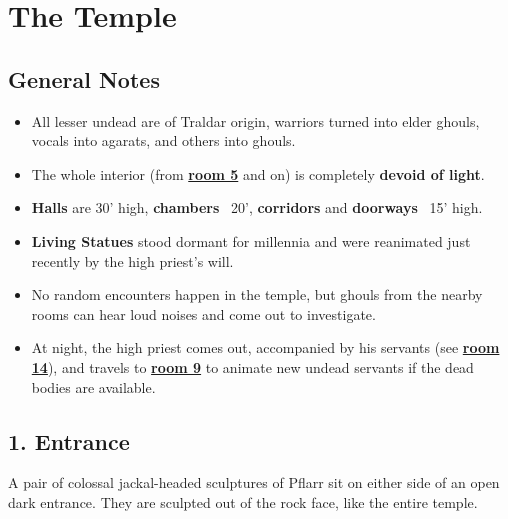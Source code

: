 \documentclass[english,11pt,openany,letterpaper,twocolumn]{book}
\begin{document}
\skipline[0pt]

\noindent
\begin{minipage}{\textwidth}
	\setmonofont{TruetypewriterPolyglOTT}
	\renewcommand{\FancyVerbFormatLine}[1]{\vspace*{-0.5ex}#1}
	{\hfill
	\hfill}
\end{minipage}

\vfill
\break


\chapter{The Temple}

\section{General Notes}

\begin{itemize}[leftmargin=*]
\item
All lesser undead are of Traldar origin, warriors turned into elder ghouls, vocals into agarats, and others into ghouls.
\item
The whole interior (from \hyperlink{room5}{\textbf{room 5}} and on) is completely \textbf{devoid of light}.
\item
\textbf{Halls} are 30' high, \textbf{chambers} \dash\ 20', \textbf{corridors} and \textbf{doorways} \dash\ 15' high.
\item
\textbf{Living Statues} stood dormant for millennia and were reanimated just recently by the high priest's will.
\item
No random encounters happen in the temple, but ghouls from the nearby rooms can hear loud noises and come out to investigate.
\item
At night, the high priest comes out, accompanied by his servants (see \hyperlink{room14}{\textbf{room 14}}), and travels to \hyperlink{room9}{\textbf{room 9}} to animate new undead servants if the dead bodies are available.
\end{itemize}


\hypertarget{room1}{}
\section{1. Entrance}

A pair of colossal jackal-headed sculptures of Pflarr sit on either side of an open dark entrance. They are sculpted out of the rock face, like the entire temple.
\end{document}
